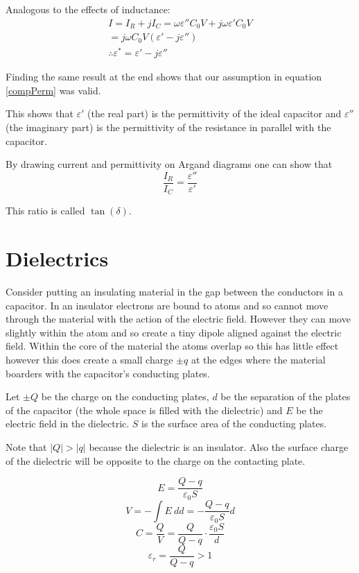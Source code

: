 \documentclass[11pt,a4paper]{report}
\begin{document}
Analogous to the effects of inductance:
\begin{eqnarray*}
	I = I_R + jI_C = \omega\varepsilon''C_0V+j\omega\varepsilon'C_0V \\
	= j\omega C_0V(\varepsilon'-j\varepsilon'') \\
	\therefore \varepsilon^* = \varepsilon' - j\varepsilon''
\end{eqnarray*}

Finding the same result at the end shows that our assumption in equation \ref{compPerm} was valid. 

This shows that $\varepsilon'$  (the real part) is the permittivity of the ideal capacitor and $\varepsilon''$ (the imaginary part) is the permittivity of the resistance in parallel with the capacitor.

By drawing current and permittivity on Argand diagrams one can show that
\begin{equation*}
	\frac{I_R}{I_C} = \frac{\varepsilon''}{\varepsilon'}
\end{equation*} 

This ratio is called $\tan(\delta)$.

\section{Dielectrics}
Consider putting an insulating material in the gap between the conductors in a capacitor. In an insulator electrons are bound to atoms and so cannot move through the material with the action of the electric field. However they can move slightly within the atom and so create a tiny dipole aligned against the electric field. Within the core of the material the atoms overlap so this has little effect however this does create a small charge $\pm q$ at the edges where the material boarders with the capacitor's conducting plates. 

Let $\pm Q$ be the charge on the conducting plates, $d$ be the separation of the plates of the capacitor (the whole space is filled with the dielectric) and $E$ be the electric field in the dielectric. $S$ is the surface area of the conducting plates. 

Note that $|Q| > |q|$ because the dielectric is an insulator. Also the surface charge of the dielectric will be opposite to the charge on the contacting plate.

\begin{equation*}
	E = \frac{Q - q}{\varepsilon_0S}
\end{equation*}
\begin{equation*}
	V = -\int E \: dd = -\frac{Q - q}{\varepsilon_0S}d
\end{equation*}
\begin{equation*}
	C = \frac{Q}{V} = \frac{Q}{Q-q}\cdot\frac{\varepsilon_0 S}{d}
\end{equation*}
\begin{equation*}
	\varepsilon_r = \frac{Q}{Q-q} > 1
\end{equation*}
\end{document}

